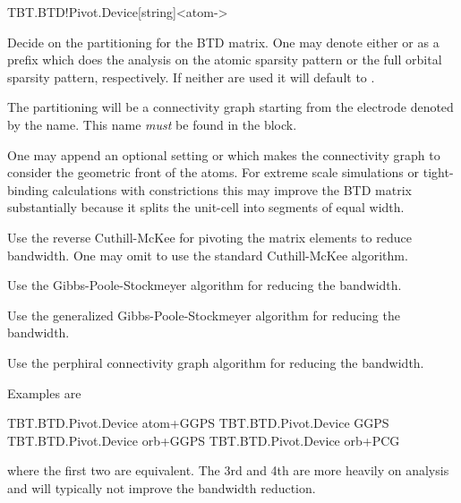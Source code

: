 \begin{fdfentry}{TBT.BTD!Pivot.Device}[string]<atom->

  Decide on the partitioning for the BTD matrix. One may denote either
   or  as a prefix which does the analysis on
  the atomic sparsity pattern or the full orbital sparsity pattern,
  respectively. If neither are used it will default to .

  \begin{fdfoptions}

    The partitioning will be a connectivity graph starting from the
    electrode denoted by the name. This name \emph{must} be found in
    the  block. 

    \note One may append an optional setting  or
     which makes the connectivity graph to consider the
    geometric front of the atoms. For extreme scale simulations or
    tight-binding calculations with constrictions this may improve the
    BTD matrix substantially because it splits the unit-cell into
    segments of equal width.

    \option[rev-CM] %
    Use the reverse Cuthill-McKee for pivoting the matrix elements to
    reduce bandwidth. One may omit  to use the standard
    Cuthill-McKee algorithm.

    \option[GPS] %
    Use the Gibbs-Poole-Stockmeyer algorithm for reducing the
    bandwidth.

    \option[GGPS] %
    Use the generalized Gibbs-Poole-Stockmeyer algorithm for reducing
    the bandwidth.

    \option[PCG] %
    Use the perphiral connectivity graph algorithm for reducing the
    bandwidth.

  \end{fdfoptions}

  Examples are
  \begin{fdfexample}
    TBT.BTD.Pivot.Device atom+GGPS
    TBT.BTD.Pivot.Device GGPS
    TBT.BTD.Pivot.Device orb+GGPS
    TBT.BTD.Pivot.Device orb+PCG
  \end{fdfexample}
  where the first two are equivalent. The 3rd and 4th are more heavily
  on analysis and will typically not improve the bandwidth reduction.

\end{fdfentry}


